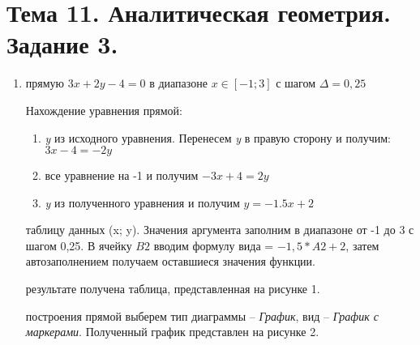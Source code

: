 \section{Тема 11. Аналитическая геометрия. Задание 3.}
\label{sec:task11}

\begin{enumerate}
	\item{} прямую $3x + 2y - 4 = 0$ в диапазоне $x \in [-1;3]$ с шагом $\Delta = 0,25$

    \begin{item}
		Нахождение уравнения прямой:
		\begin{enumerate}
			\item{} \textit{y} из исходного уравнения. Перенесем \textit{y} в правую сторону и получим: $3x - 4 = -2y$
			\item{} все уравнение на -1 и получим $-3x + 4 = 2y$
			\item{} \textit{y} из полученного уравнения и получим $y = -1.5x + 2$
		\end{enumerate}
	\end{item}

	\begin{item}
		 таблицу данных (x; y). Значения аргумента заполним в диапазоне от -1 до 3 с шагом 0,25. В ячейку $B2$ вводим формулу вида = $-1,5 * A2 + 2$, затем автозаполнением получаем оставшиеся значения функции.

		 результате получена таблица, представленная на рисунке 1.

		 построения прямой выберем тип диаграммы -- \textit{График}, вид -- \textit{График с маркерами}. Полученный график представлен на рисунке 2.

	\end{item}
\end{enumerate}